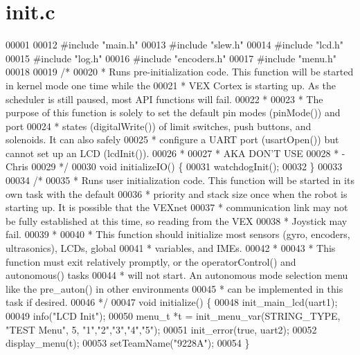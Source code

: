 \section{init.\+c}
\label{init_8c_source}

\begin{DoxyCode}
00001 
00012 \textcolor{preprocessor}{#include "main.h"}
00013 \textcolor{preprocessor}{#include "slew.h"}
00014 \textcolor{preprocessor}{#include "lcd.h"}
00015 \textcolor{preprocessor}{#include "log.h"}
00016 \textcolor{preprocessor}{#include "encoders.h"}
00017 \textcolor{preprocessor}{#include "menu.h"}
00018 
00019 \textcolor{comment}{/*}
00020 \textcolor{comment}{ * Runs pre-initialization code. This function will be started in kernel mode one time while the}
00021 \textcolor{comment}{ * VEX Cortex is starting up. As the scheduler is still paused, most API functions will fail.}
00022 \textcolor{comment}{ *}
00023 \textcolor{comment}{ * The purpose of this function is solely to set the default pin modes (pinMode()) and port}
00024 \textcolor{comment}{ * states (digitalWrite()) of limit switches, push buttons, and solenoids. It can also safely}
00025 \textcolor{comment}{ * configure a UART port (usartOpen()) but cannot set up an LCD (lcdInit()).}
00026 \textcolor{comment}{ *}
00027 \textcolor{comment}{ * AKA DON'T USE}
00028 \textcolor{comment}{ * -Chris}
00029 \textcolor{comment}{ */}
00030 \textcolor{keywordtype}{void} initializeIO() \{
00031     watchdogInit();
00032 \}
00033 
00034 \textcolor{comment}{/*}
00035 \textcolor{comment}{ * Runs user initialization code. This function will be started in its own task with the default}
00036 \textcolor{comment}{ * priority and stack size once when the robot is starting up. It is possible that the VEXnet}
00037 \textcolor{comment}{ * communication link may not be fully established at this time, so reading from the VEX}
00038 \textcolor{comment}{ * Joystick may fail.}
00039 \textcolor{comment}{ *}
00040 \textcolor{comment}{ * This function should initialize most sensors (gyro, encoders, ultrasonics), LCDs, global}
00041 \textcolor{comment}{ * variables, and IMEs.}
00042 \textcolor{comment}{ *}
00043 \textcolor{comment}{ * This function must exit relatively promptly, or the operatorControl() and autonomous() tasks}
00044 \textcolor{comment}{ * will not start. An autonomous mode selection menu like the pre\_auton() in other environments}
00045 \textcolor{comment}{ * can be implemented in this task if desired.}
00046 \textcolor{comment}{ */}
00047 \textcolor{keywordtype}{void} initialize() \{
00048   init_main_lcd(uart1);
00049   info(\textcolor{stringliteral}{"LCD Init"});
00050   menu_t *t = init_menu_var(STRING_TYPE, \textcolor{stringliteral}{"TEST Menu"}, 5, \textcolor{stringliteral}{"1"},\textcolor{stringliteral}{"2"},\textcolor{stringliteral}{"3"},\textcolor{stringliteral}{"4"},\textcolor{stringliteral}{"5"});
00051   init_error(\textcolor{keyword}{true}, uart2);
00052   display_menu(t);
00053   setTeamName(\textcolor{stringliteral}{"9228A"});
00054 \}
\end{DoxyCode}
